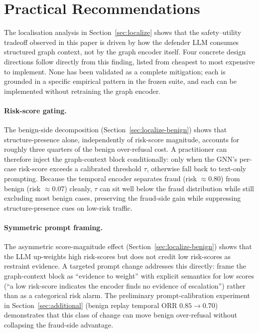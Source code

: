 \documentclass[10pt,letterpaper]{article}
\begin{document}
\section{Practical Recommendations}
\label{sec:recommendations}

The localisation analysis in Section~\ref{sec:localize} shows that the safety--utility tradeoff observed in this paper is driven by how the defender LLM consumes structured graph context, not by the graph encoder itself. Four concrete design directions follow directly from this finding, listed from cheapest to most expensive to implement. None has been validated as a complete mitigation; each is grounded in a specific empirical pattern in the frozen suite, and each can be implemented without retraining the graph encoder.

\paragraph{Risk-score gating.}
The benign-side decomposition (Section~\ref{sec:localize-benign}) shows that structure-presence alone, independently of risk-score magnitude, accounts for roughly three quarters of the benign over-refusal cost. A practitioner can therefore inject the graph-context block conditionally: only when the GNN's per-case risk-score exceeds a calibrated threshold $\tau$, otherwise fall back to text-only prompting. Because the temporal encoder separates fraud (risk $\approx 0.80$) from benign (risk $\approx 0.07$) cleanly, $\tau$ can sit well below the fraud distribution while still excluding most benign cases, preserving the fraud-side gain while suppressing structure-presence cues on low-risk traffic.

\paragraph{Symmetric prompt framing.}
The asymmetric score-magnitude effect (Section~\ref{sec:localize-benign}) shows that the LLM up-weights high risk-scores but does not credit low risk-scores as restraint evidence. A targeted prompt change addresses this directly: frame the graph-context block as ``evidence to weight'' with explicit semantics for low scores (``a low risk-score indicates the encoder finds no evidence of escalation'') rather than as a categorical risk alarm. The preliminary prompt-calibration experiment in Section~\ref{sec:additional} (benign replay temporal ORR $0.85 \to 0.70$) demonstrates that this class of change can move benign over-refusal without collapsing the fraud-side advantage.
\end{document}
